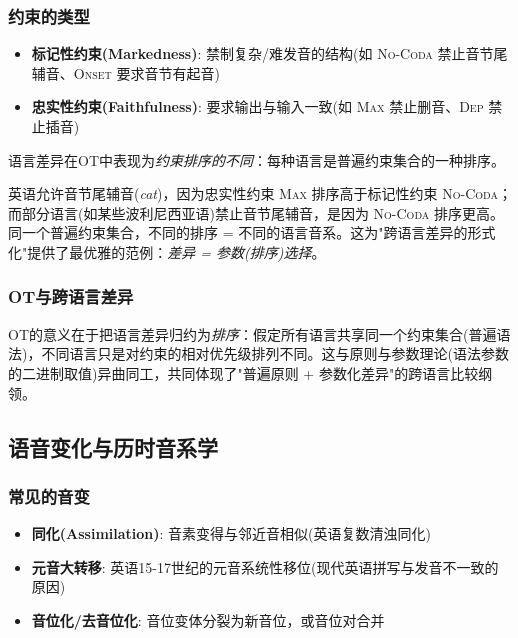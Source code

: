 \subsubsection{约束的类型}

\begin{itemize}
    \item \textbf{标记性约束(Markedness)}: 禁制复杂/难发音的结构(如 \textsc{No-Coda} 禁止音节尾辅音、\textsc{Onset} 要求音节有起音)
    \item \textbf{忠实性约束(Faithfulness)}: 要求输出与输入一致(如 \textsc{Max} 禁止删音、\textsc{Dep} 禁止插音)
\end{itemize}

语言差异在OT中表现为\emph{约束排序的不同}：每种语言是普遍约束集合的一种排序。

\begin{example}
英语允许音节尾辅音(\emph{cat})，因为忠实性约束 \textsc{Max} 排序高于标记性约束 \textsc{No-Coda}；而部分语言(如某些波利尼西亚语)禁止音节尾辅音，是因为 \textsc{No-Coda} 排序更高。同一个普遍约束集合，不同的排序 = 不同的语言音系。这为"跨语言差异的形式化"提供了最优雅的范例：\emph{差异 = 参数(排序)选择}。
\end{example}

\subsubsection{OT与跨语言差异}

OT的意义在于把语言差异归约为\emph{排序}：假定所有语言共享同一个约束集合(普遍语法)，不同语言只是对约束的相对优先级排列不同。这与原则与参数理论(语法参数的二进制取值)异曲同工，共同体现了"普遍原则 + 参数化差异"的跨语言比较纲领。

\subsection{语音变化与历时音系学}

\subsubsection{常见的音变}

\begin{itemize}
    \item \textbf{同化(Assimilation)}: 音素变得与邻近音相似(英语复数清浊同化)
    \item \textbf{元音大转移}: 英语15-17世纪的元音系统性移位(现代英语拼写与发音不一致的原因)
    \item \textbf{音位化/去音位化}: 音位变体分裂为新音位，或音位对合并
\end{itemize}

